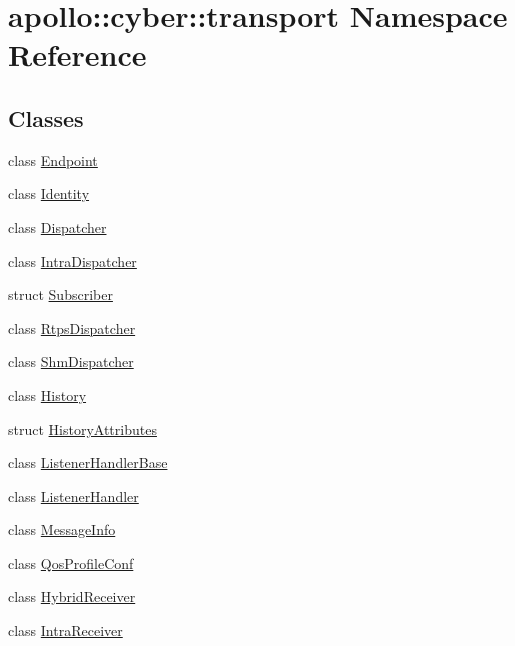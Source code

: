 \hypertarget{namespaceapollo_1_1cyber_1_1transport}{\section{apollo\-:\-:cyber\-:\-:transport Namespace Reference}
\label{namespaceapollo_1_1cyber_1_1transport}
}
\subsection*{Classes}
\begin{DoxyCompactItemize}
\item 
class \hyperlink{classapollo_1_1cyber_1_1transport_1_1Endpoint}{Endpoint}
\item 
class \hyperlink{classapollo_1_1cyber_1_1transport_1_1Identity}{Identity}
\item 
class \hyperlink{classapollo_1_1cyber_1_1transport_1_1Dispatcher}{Dispatcher}
\item 
class \hyperlink{classapollo_1_1cyber_1_1transport_1_1IntraDispatcher}{Intra\-Dispatcher}
\item 
struct \hyperlink{structapollo_1_1cyber_1_1transport_1_1Subscriber}{Subscriber}
\item 
class \hyperlink{classapollo_1_1cyber_1_1transport_1_1RtpsDispatcher}{Rtps\-Dispatcher}
\item 
class \hyperlink{classapollo_1_1cyber_1_1transport_1_1ShmDispatcher}{Shm\-Dispatcher}
\item 
class \hyperlink{classapollo_1_1cyber_1_1transport_1_1History}{History}
\item 
struct \hyperlink{structapollo_1_1cyber_1_1transport_1_1HistoryAttributes}{History\-Attributes}
\item 
class \hyperlink{classapollo_1_1cyber_1_1transport_1_1ListenerHandlerBase}{Listener\-Handler\-Base}
\item 
class \hyperlink{classapollo_1_1cyber_1_1transport_1_1ListenerHandler}{Listener\-Handler}
\item 
class \hyperlink{classapollo_1_1cyber_1_1transport_1_1MessageInfo}{Message\-Info}
\item 
class \hyperlink{classapollo_1_1cyber_1_1transport_1_1QosProfileConf}{Qos\-Profile\-Conf}
\item 
class \hyperlink{classapollo_1_1cyber_1_1transport_1_1HybridReceiver}{Hybrid\-Receiver}
\item 
class \hyperlink{classapollo_1_1cyber_1_1transport_1_1IntraReceiver}{Intra\-Receiver}

\end{DoxyCompactItemize}
